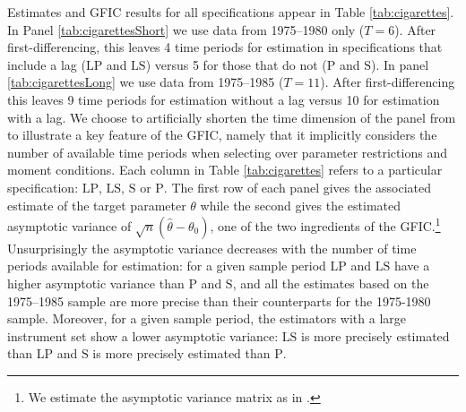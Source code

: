 Estimates and GFIC results for all specifications appear in Table \ref{tab:cigarettes}.
In Panel \ref{tab:cigarettesShort} we use data from 1975--1980 only ($T=6$).
After first-differencing, this leaves 4 time periods for estimation in specifications that include a lag ($\text{LP}$ and $\text{LS}$) versus 5 for those that do not ($\text{P}$ and $\text{S}$).
In panel \ref{tab:cigarettesLong} we use data from 1975--1985 ($T=11$).
After first-differencing this leaves 9 time periods for estimation without a lag versus 10 for estimation with a lag.
We choose to artificially shorten the time dimension of the panel from \cite{BaltagiEtAl2000} to illustrate a key feature of the GFIC, namely that it implicitly considers the number of available time periods when selecting over parameter restrictions and moment conditions. 
Each column in Table \ref{tab:cigarettes} refers to a particular specification: $\text{LP}$, $\text{LS}$, $\text{S}$ or $\text{P}$.
The first row of each panel gives the associated estimate of the target parameter $\theta$ while the second gives the estimated asymptotic variance of $\sqrt{n}(\widehat{\theta} - \theta_0)$, one of the two ingredients of the GFIC.\footnote{We estimate the asymptotic variance matrix as in \cite{BaltagiEtAl2000}.}
Unsurprisingly the asymptotic variance decreases with the number of time periods available for estimation: for a given sample period $\text{LP}$ and $\text{LS}$ have a higher asymptotic variance than $\text{P}$ and $\text{S}$, and all the estimates based on the 1975--1985 sample are more precise than their counterparts for the 1975-1980 sample.
Moreover, for a given sample period, the estimators with a large instrument set show a lower asymptotic variance: $\text{LS}$ is more precisely estimated than $\text{LP}$ and $\text{S}$ is more precisely estimated than $\text{P}$.

